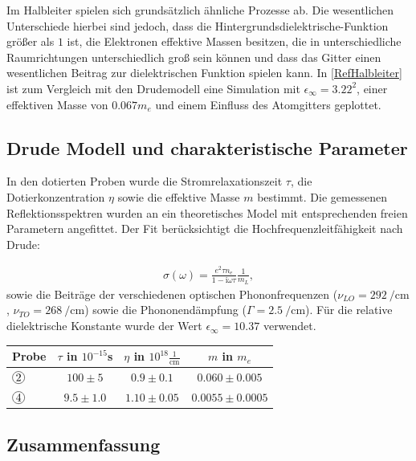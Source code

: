 \documentclass[paper=a4,fontsize=10pt,DIV=18,twocolumn,parskip=half]{scrartcl}
\numberwithin{equation}{section}    %
\begin{document}
Im Halbleiter spielen sich grundsätzlich ähnliche Prozesse ab. Die wesentlichen 
Unterschiede hierbei sind jedoch, dass die Hintergrundsdielektrische-Funktion 
größer als $1$ ist, die Elektronen effektive Massen besitzen, die in 
unterschiedliche Raumrichtungen unterschiedlich groß sein können und dass das 
Gitter einen wesentlichen Beitrag zur dielektrischen Funktion spielen kann. In 
\ref{RefHalbleiter} ist zum Vergleich mit den Drudemodell eine Simulation mit 
$\epsilon_\infty=3.22^2$, einer effektiven Masse von $0.067m_e$ und einem 
Einfluss des Atomgitters geplottet.

\subsection{Drude Modell und charakteristische Parameter}

In den dotierten Proben wurde die Stromrelaxationszeit $\tau$, die 
Dotierkonzentration $\eta$ sowie die effektive Masse $m$ bestimmt. Die 
gemessenen Reflektionsspektren wurden an ein theoretisches Model mit 
entsprechenden freien Parametern angefittet. Der Fit berücksichtigt die 
Hochfrequenzleitfähigkeit nach Drude:

\begin{align}
    \sigma(\omega) = \frac{e^2 \tau n_e}{1-\text{i}\omega\tau} 
    \frac{1}{m_L},
\end{align}
sowie die Beiträge der verschiedenen optischen Phononfrequenzen 
($\nu_{LO}=\SI{292}{\per\centi\meter}$, $\nu_{TO}=\SI{268}{\per\centi\meter}$) 
sowie die Phononendämpfung ($\Gamma=\SI{2.5}{\per\centi\meter}$). Für die 
relative dielektrische Konstante wurde der Wert $\epsilon_{\infty}=10.37$ 
verwendet.

\begin{tabular}{l c c c}
    Probe & $\tau$ in $10^{-15}$s & $\eta$ in $10^{18} \frac{1}{\text{cm}}$ &
   $m$ in $m_e$ \\
   \hline
   $\circled{2}$ & $100\pm5$ & $0.9\pm0.1$ & $0.060\pm0.005$ \\
   $\circled{4}$ & $9.5\pm1.0$ & $1.10\pm0.05$ & $0.0055\pm0.0005$
\end{tabular}





\subsection{Zusammenfassung}
\end{document}
